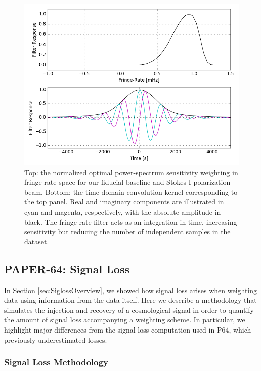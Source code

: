 \documentclass[preprint2,numberedappendix,tighten]{aastex6}  %
\begin{document}
\begin{figure}
	\centering
	\includegraphics[width=\columnwidth]{plots/frp.png}
	\caption{Top: the normalized optimal power-spectrum sensitivity weighting in fringe-rate space for our fiducial baseline and Stokes I polarization beam. Bottom: the time-domain convolution kernel corresponding to the top panel. Real and imaginary components are illustrated in cyan and magenta, respectively, with the absolute amplitude in black. The fringe-rate filter acts as an integration in time, increasing sensitivity but reducing the number of independent samples in the dataset.}
	\label{fig:frp}
\end{figure}


\subsection{PAPER-64: Signal Loss}
\label{sec:Sigloss}

In Section \ref{sec:SiglossOverview}, we showed how signal loss arises when weighting data using information from the data itself. Here we describe a methodology that simulates the injection and recovery of a cosmological signal in order to quantify the amount of signal loss accompanying a weighting scheme. In particular, we highlight major differences from the signal loss computation used in P64, which previously underestimated losses. 

\subsubsection{Signal Loss Methodology} 
\end{document}
